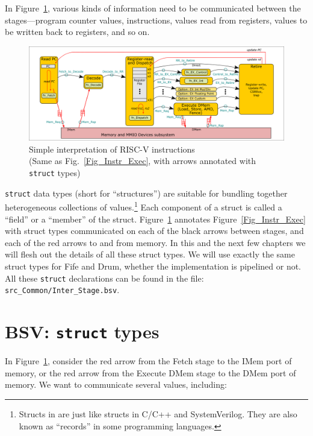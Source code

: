 In Figure~\ref{Fig_Simple_Instr_Exec_w_structs}, various kinds of
information need to be communicated between the stages---program
counter values, instructions, values read from registers, values to be
written back to registers, and so on.
\begin{figure}[htbp]
  \centerline{\includegraphics[width=6in,angle=0]{Figures/Fig_Instr_Exec_w_structs}}
  \caption{\label{Fig_Simple_Instr_Exec_w_structs}
           Simple interpretation of RISC-V instructions \\
	   \hmmmm\hmm (Same as Fig.~\ref{Fig_Instr_Exec}, with arrows annotated with {\tt struct} types)}
\end{figure}
\verb|struct| data types (short for ``structures'') are suitable for
bundling together heterogeneous collections of
values.\footnote{Structs in {\BSV} are just like structs in C/C++ and
SystemVerilog.  They are also known as ``records'' in some programming
languages.}  Each component of a struct is called a ``field'' or a
``member'' of the struct.
Figure~\ref{Fig_Simple_Instr_Exec_w_structs} annotates
Figure~\ref{Fig_Instr_Exec} with struct types communicated on each of
the black arrows between stages, and each of the red arrows to and
from memory.  In this and the next few chapters we will flesh out the
details of all these struct types.  We will use exactly the same
struct types for Fife and Drum, {\ie} whether the implementation is
pipelined or not.  All these \verb|struct| declarations can be found
in the file: \verb|src_Common/Inter_Stage.bsv|.


\section{BSV: {\tt struct} types}

\label{BSV_struct_types}
\label{Sec_Mem_Req}

In Figure~\ref{Fig_Simple_Instr_Exec_w_structs}, consider the red
arrow from the Fetch stage to the IMem port of memory, or the red
arrow from the Execute DMem stage to the DMem port of memory.  We want
to communicate several values, including:

